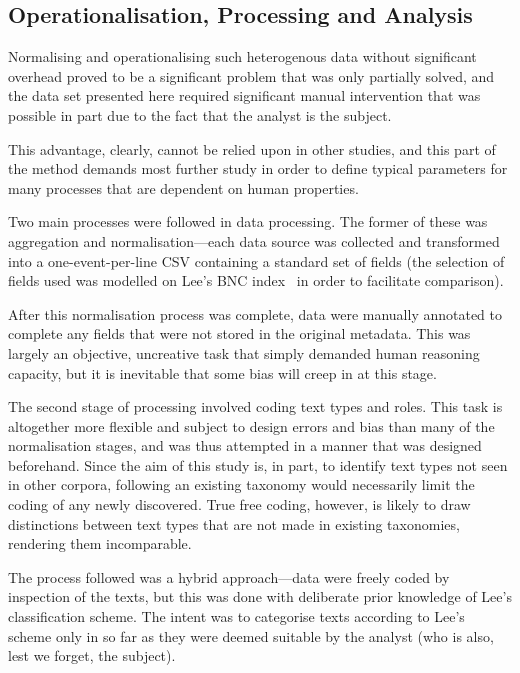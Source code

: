 \subsection{Operationalisation, Processing and Analysis}
\label{sec:personal:method:operationalisation}
Normalising and operationalising such heterogenous data without significant overhead proved to be a significant problem that was only partially solved, and the data set presented here required significant manual intervention that was possible in part due to the fact that the analyst is the subject.

This advantage, clearly, cannot be relied upon in other studies, and this part of the method demands most further study in order to define typical parameters for many processes that are dependent on human properties.

Two main processes were followed in data processing.  The former of these was aggregation and normalisation---each data source was collected and transformed into a one-event-per-line CSV containing a standard set of fields (the selection of fields used was modelled on Lee's BNC index~\cite{lee2001genres} in order to facilitate comparison).

After this normalisation process was complete, data were manually annotated to complete any fields that were not stored in the original metadata.  This was largely an objective, uncreative task that simply demanded human reasoning capacity, but it is inevitable that some bias will creep in at this stage.

The second stage of processing involved coding text types and roles.  This task is altogether more flexible and subject to design errors and bias than many of the normalisation stages, and was thus attempted in a manner that was designed beforehand.  Since the aim of this study is, in part, to identify text types not seen in other corpora, following an existing taxonomy would necessarily limit the coding of any newly discovered.  True free coding, however, is likely to draw distinctions between text types that are not made in existing taxonomies, rendering them incomparable.

The process followed was a hybrid approach---data were freely coded by inspection of the texts, but this was done with deliberate prior knowledge of Lee's classification scheme.  The intent was to categorise texts according to Lee's scheme only in so far as they were deemed suitable by the analyst (who is also, lest we forget, the subject).

